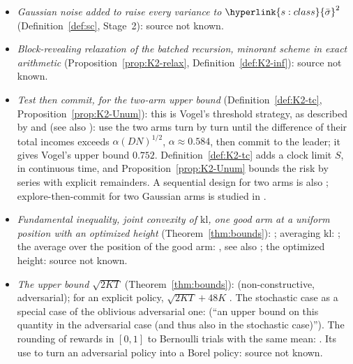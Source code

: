 \documentclass[11pt]{article}
\DeclareRobustCommand{\sy}[2]{{\hyperlink{#1}{#2}}}
\newcommand{\1}{\mathbf{1}}
\newcommand{\kl}{\mathrm{kl}}
\newcommand{\sbar}{\sy{s:class}{\bar\sigma}}
\newcommand{\SC}{\sy{alg:sc}{\textsc{Screen-Core}}}
\begin{document}
\begin{itemize}
strategy for close alternatives, is \citet[Section~2, Theorem~2 and Corollary~1]{Kol20} (its Lemma~1 uses Vogel's threshold idea), proposed
before, numerically, as a ``modified Vogel's strategy'' \citep[Section~IV]{Kol16}: this is the two-arm ancestor of Stage~1 of \SC{} and of
the reduction in Theorem~\ref{thm:u-upper}. The $K$-arm, gap-free form with variance equalization: source not known.
\item \emph{Gaussian noise added to raise every variance to $\sbar^2$} (Definition~\ref{def:sc}, Stage~2): source not known.
\item \emph{Block-revealing relaxation of the batched recursion, minorant scheme in exact arithmetic} (Proposition~\ref{prop:K2-relax},
Definition~\ref{def:K2-inf}): source not known.
\item \emph{Test then commit, for the two-arm upper bound} (Definition~\ref{def:K2-tc}, Proposition~\ref{prop:K2-Unum}): this is Vogel's threshold
strategy, as described by \citet[Theorem~1]{KNS17} and \citet[Section~I, Theorem~1]{Kol16} (see also \citealp{Vog60}): use the two arms turn by
turn until the difference of their total incomes exceeds $\alpha(DN)^{1/2}$, $\alpha\approx0.584$, then commit to the leader; it gives Vogel's
upper bound $0.752$. Definition~\ref{def:K2-tc} adds a clock limit $S$, in continuous time, and Proposition~\ref{prop:K2-Unum} bounds the risk
by series with explicit remainders. A sequential design for two arms is also \citet{Vog60a}; explore-then-commit for two Gaussian arms is studied
in \citet{GKL16}.
\item \emph{Fundamental inequality, joint convexity of $\kl$, one good arm at a uniform position with an optimized height}
(Theorem~\ref{thm:bounds}): \citet[(6) and Lemma~1]{GMS19}; averaging $\kl$: \citet[Section~3, (4)--(5), with Corollary~3]{GMS20}; the average over the
position of the good arm: \citet[Exercise~15.2]{LS}, see also \citet{ACFS02}; the optimized height: source not known.
\item \emph{The upper bound $\sqrt{2KT}$} (Theorem~\ref{thm:bounds}): \citet[Theorem~6.1]{LS19} (non-constructive, adversarial); for an explicit
policy, $\sqrt{2KT}+48K$ \citep[Theorem~11]{ZL19}. The stochastic case as a special case of the oblivious adversarial one:
\citet[Section~1]{AB09} (``an upper bound on this quantity in the adversarial case (and thus also in the stochastic case)''). The rounding of rewards in
$[0,1]$ to Bernoulli trials with the same mean: \citet[Section~1.2, Algorithm~2]{AG12}. Its use to turn an adversarial policy into a Borel policy:
source not known.
\end{itemize}
\end{document}
